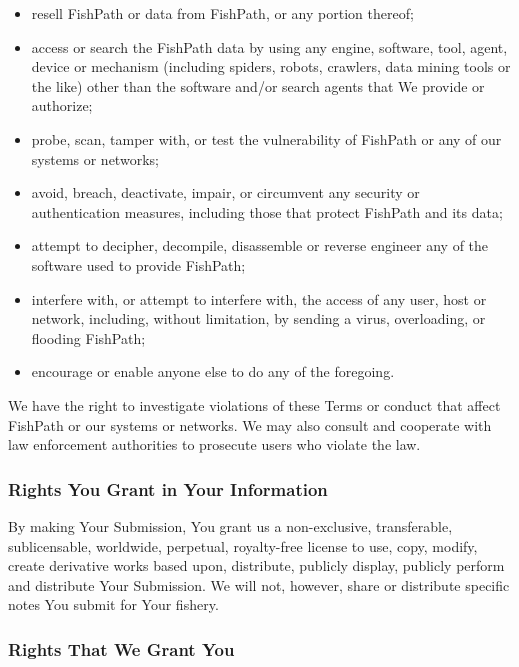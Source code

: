 \documentclass[
  11pt,
]{book}
\providecommand{\tightlist}{%
  \setlength{\itemsep}{0pt}\setlength{\parskip}{0pt}}
\begin{document}
\begin{itemize}
\tightlist
\item
  resell FishPath or data from FishPath, or any portion thereof;
\item
  access or search the FishPath data by using any engine, software, tool, agent, device or mechanism (including spiders, robots, crawlers, data mining tools or the like) other than the software and/or search agents that We provide or authorize;
\item
  probe, scan, tamper with, or test the vulnerability of FishPath or any of our systems or networks;
\item
  avoid, breach, deactivate, impair, or circumvent any security or authentication measures, including those that protect FishPath and its data;
\item
  attempt to decipher, decompile, disassemble or reverse engineer any of the software used to provide FishPath;
\item
  interfere with, or attempt to interfere with, the access of any user, host or network, including, without limitation, by sending a virus, overloading, or flooding FishPath;
\item
  encourage or enable anyone else to do any of the foregoing.
\end{itemize}

We have the right to investigate violations of these Terms or conduct that affect FishPath or our systems or networks. We may also consult and cooperate with law enforcement authorities to prosecute users who violate the law.

\hypertarget{rights-you-grant-in-your-information}{%
\subsubsection*{Rights You Grant in Your Information}\label{rights-you-grant-in-your-information}}

By making Your Submission, You grant us a non-exclusive, transferable, sublicensable, worldwide, perpetual, royalty-free license to use, copy, modify, create derivative works based upon, distribute, publicly display, publicly perform and distribute Your Submission. We will not, however, share or distribute specific notes You submit for Your fishery.

\hypertarget{rights-that-we-grant-you}{%
\subsubsection*{Rights That We Grant You}\label{rights-that-we-grant-you}}
\end{document}
